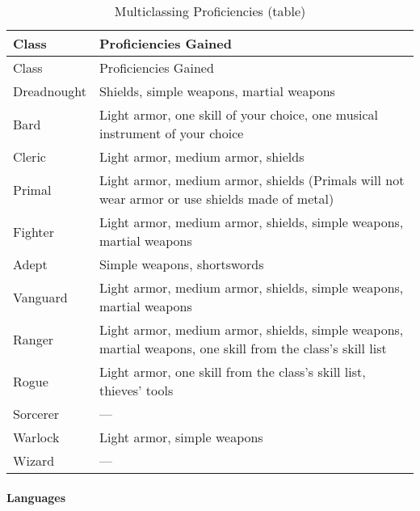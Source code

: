\begin{longtable}[]{@{}
  >{\raggedright\arraybackslash}p{}
  >{\raggedright\arraybackslash}p{}@{}}
\caption{Multiclassing Proficiencies
(table)}\label{multiclassing-proficiencies-table}\tabularnewline
\toprule\noalign{}
\begin{minipage}[b]{\linewidth}\raggedright
Class
\end{minipage} & \begin{minipage}[b]{\linewidth}\raggedright
Proficiencies Gained
\end{minipage} \\
\midrule\noalign{}
\endfirsthead
\toprule\noalign{}
\begin{minipage}[b]{\linewidth}\raggedright
Class
\end{minipage} & \begin{minipage}[b]{\linewidth}\raggedright
Proficiencies Gained
\end{minipage} \\
\midrule\noalign{}
\endhead
\bottomrule\noalign{}
\endlastfoot
Dreadnought & Shields, simple weapons, martial weapons \\
Bard & Light armor, one skill of your choice, one musical instrument of
your choice \\
Cleric & Light armor, medium armor, shields \\
Primal & Light armor, medium armor, shields (Primals will not wear armor
or use shields made of metal) \\
Fighter & Light armor, medium armor, shields, simple weapons, martial
weapons \\
Adept & Simple weapons, shortswords \\
Vanguard & Light armor, medium armor, shields, simple weapons, martial
weapons \\
Ranger & Light armor, medium armor, shields, simple weapons, martial
weapons, one skill from the class's skill list \\
Rogue & Light armor, one skill from the class's skill list, thieves'
tools \\
Sorcerer & --- \\
Warlock & Light armor, simple weapons \\
Wizard & --- \\
\end{longtable}

\paragraph{Languages}\label{languages}

